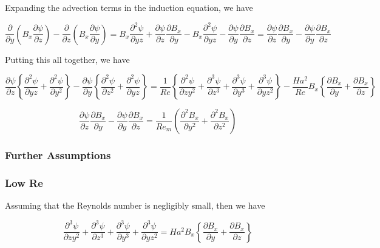 \documentclass[11pt]{article}
\begin{document}
Expanding the advection terms in the induction equation, we have

\begin{equation}
	\frac{\partial}{\partial y} \left( B_x \frac{\partial \psi}{\partial z} \right)
	- \frac{\partial}{\partial z} \left( B_x \frac{\partial \psi}{\partial y} \right)
	=
	B_x \frac{\partial^2 \psi}{\partial yz}
	+
	\frac{\partial \psi}{\partial z}
	\frac{\partial B_x}{\partial y}
	-
	B_x
	\frac{\partial^2 \psi}{\partial y z}
	-
	\frac{\partial \psi}{\partial y}
	\frac{\partial B_x}{\partial z}
	=
	\frac{\partial \psi}{\partial z}
	\frac{\partial B_x}{\partial y}
	-
	\frac{\partial \psi}{\partial y}
	\frac{\partial B_x}{\partial z}
\end{equation}

Putting this all together, we have

\begin{equation}
	\frac{\partial \psi }{\partial z}
	\left\{
	\frac{\partial^2 \psi}{\partial yz}
	+
	\frac{\partial^2 \psi}{\partial y^2}
	\right\}
	-
	\frac{\partial \psi}{\partial y}
	\left\{
	\frac{\partial^2 \psi}{\partial z^2}
	+
	\frac{\partial^2 \psi}{\partial yz}
	\right\}
	=
	\frac{1}{Re}
	\left\{
	\frac{\partial^2 \psi}{\partial z y^2}
	+
	\frac{\partial^3 \psi}{\partial z^3}
	+
	\frac{\partial^3 \psi}{\partial y^3}
	+\frac{\partial^3 \psi}{\partial y z^2}
	\right\}
	- 
	\frac{Ha^2}{Re}
	B_x
	\left\{
	\frac{\partial B_x}{\partial y} 
	+
	\frac{\partial B_x}{\partial z}
	\right\}
\end{equation}

\begin{equation}
	\frac{\partial \psi}{\partial z}
	\frac{\partial B_x}{\partial y}
	-
	\frac{\partial \psi}{\partial y}
	\frac{\partial B_x}{\partial z}
	=
	\frac{1}{Re_m}
	\left(
	\frac{\partial^2 B_x}{\partial y^2}
	+ \frac{\partial^2 B_x}{\partial z^2}
	\right)
\end{equation}


\subsubsection{Further Assumptions}

\subsubsection{Low Re}
Assuming that the Reynolds number is negligibly small, then we have


\begin{equation}
	\frac{\partial^3 \psi}{\partial z y^2}
	+
	\frac{\partial^3 \psi}{\partial z^3}
	+
	\frac{\partial^3 \psi}{\partial y^3}
	+\frac{\partial^3 \psi}{\partial y z^2}
	=
	Ha^2
	B_x
	\left\{
	\frac{\partial B_x}{\partial y} 
	+
	\frac{\partial B_x}{\partial z}
	\right\}
\end{equation}
\end{document}
